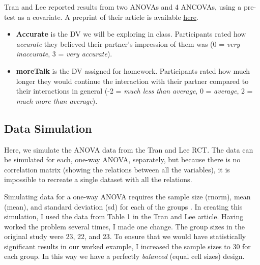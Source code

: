 \documentclass[
  english,
]{book}
\providecommand{\tightlist}{%
  \setlength{\itemsep}{0pt}\setlength{\parskip}{0pt}}
\begin{document}
Tran and Lee \citeyearpar{tran_you_2014} reported results from two ANOVAs and 4 ANCOVAs, using a pre-test as a covariate. A preprint of their article is available \href{https://pdfs.semanticscholar.org/4146/b528961c041de317c6a4c699f12fc5a4bc22.pdf?_ga=2.179078439.2028716028.1610939782-1660125104.1610939782}{here}.

\begin{itemize}
\tightlist
\item
  \textbf{Accurate} is the DV we will be exploring in class. Participants rated how \emph{accurate} they believed their partner's impression of them was (0 = \emph{very inaccurate}, 3 = \emph{very accurate}).
\item
  \textbf{moreTalk} is the DV assigned for homework. Participants rated how much longer they would continue the interaction with their partner compared to their interactions in general (-2 = \emph{much less than average}, 0 = \emph{average}, 2 = \emph{much more than average}).
\end{itemize}

\hypertarget{data-simulation}{%
\subsection{Data Simulation}\label{data-simulation}}

Here, we simulate the ANOVA data from the Tran and Lee \citeyearpar{tran_you_2014} RCT. The data can be simulated for each, one-way ANOVA, separately, but because there is no correlation matrix (showing the relations between all the variables), it is impossible to recreate a single dataset with all the relations.

Simulating data for a one-way ANOVA requires the sample size (rnorm), mean (mean), and standard deviation (sd) for each of the groups \citep{crump_programming_2018}. In creating this simulation, I used the data from Table 1 in the Tran and Lee \citeyearpar{tran_you_2014} article. Having worked the problem several times, I made one change. The group sizes in the original study were 23, 22, and 23. To ensure that we would have statistically significant results in our worked example, I increased the sample sizes to 30 for each group. In this way we have a perfectly \emph{balanced} (equal cell sizes) design.
\end{document}
